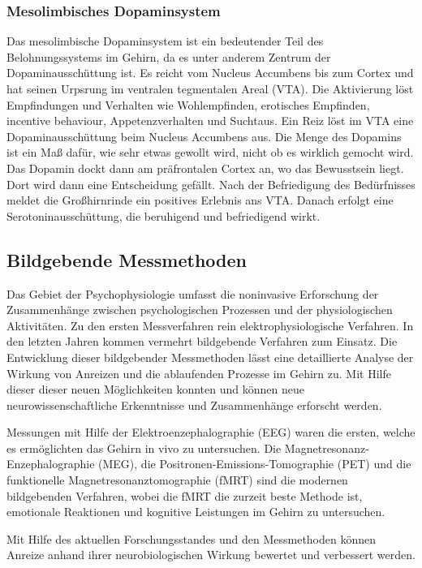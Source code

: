 \subsubsection{Mesolimbisches Dopaminsystem}
Das mesolimbische Dopaminsystem ist ein bedeutender Teil des Belohnungssystems im Gehirn, da es unter anderem Zentrum der Dopaminausschüttung ist. Es  reicht vom Nucleus Accumbens bis zum Cortex und hat seinen Urpsrung im ventralen tegmentalen Areal (VTA). \citep[S. 11]{Nowka.2013} Die Aktivierung löst \glqq Empfindungen und Verhalten wie Wohlempfinden, erotisches Empfinden, \glqq incentive behaviour\grqq, Appetenzverhalten und Sucht\grqq aus. \cite[S. 37]{Derouiche.2011} 
\newline Ein Reiz löst im VTA eine Dopaminausschüttung beim Nucleus Accumbens aus. Die Menge des Dopamins ist ein Maß dafür, wie sehr etwas gewollt wird, nicht ob es wirklich gemocht wird. Das Dopamin dockt dann am präfrontalen Cortex an, wo das Bewusstsein liegt. Dort wird dann eine Entscheidung gefällt. Nach der Befriedigung des Bedürfnisses meldet die Großhirnrinde ein positives Erlebnis ans VTA. Danach erfolgt eine Serotoninausschüttung, die beruhigend und befriedigend wirkt. \cite[S. 16]{Seelbach.2011}

\subsection{Bildgebende Messmethoden}
Das Gebiet der Psychophysiologie umfasst die noninvasive Erforschung der Zusammenhänge zwischen psychologischen Prozessen und der physiologischen Aktivitäten. Zu den ersten Messverfahren rein elektrophysiologische Verfahren. In den letzten Jahren kommen vermehrt bildgebende Verfahren zum Einsatz. \citep[S. 232]{Kirschbaum.2008}
Die Entwicklung dieser bildgebender Messmethoden lässt eine detaillierte Analyse der Wirkung von Anreizen und die ablaufenden Prozesse im Gehirn  zu. Mit Hilfe dieser dieser neuen Möglichkeiten konnten und können neue neurowissenschaftliche Erkenntnisse und Zusammenhänge erforscht werden. \citep[S. 15]{Nowka.2013}
 
Messungen mit Hilfe der Elektroenzephalographie (EEG) waren die ersten, welche es ermöglichten das Gehirn in vivo zu untersuchen. \citep[S. 43]{Weber.2011}  Die Magnetresonanz-Enzephalographie (MEG), die Positronen-Emissions-Tomographie (PET)  und die funktionelle Magnetresonanztomographie (fMRT) sind die modernen bildgebenden Verfahren, wobei die fMRT die zurzeit beste Methode ist, emotionale Reaktionen und kognitive Leistungen im Gehirn zu untersuchen. \citep[S. 50]{Weber.2011}
 
Mit Hilfe des aktuellen Forschungsstandes und den \glqq Messmethoden können Anreize anhand ihrer neurobiologischen Wirkung bewertet und verbessert werden.\grqq \citep[S. 17]{Nowka.2013}